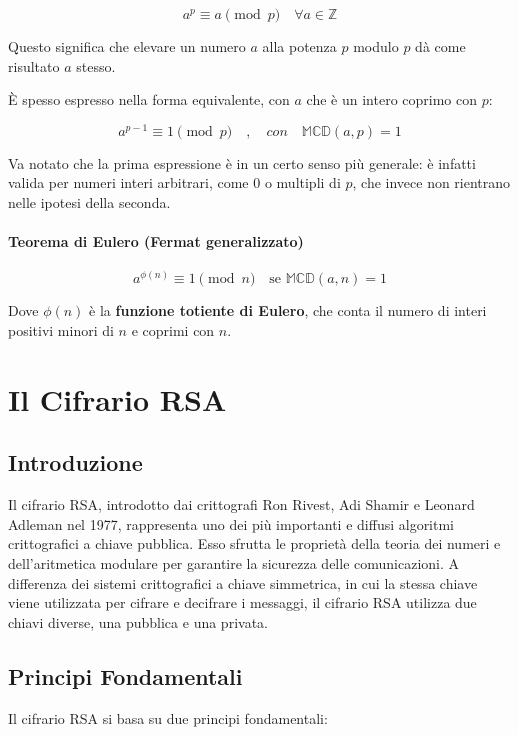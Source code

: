 \documentclass[a4paper,12pt]{report}
\begin{document}
$$a^p \equiv a \pmod{p} \quad \forall a \in \mathbb{Z}$$

Questo significa che elevare un numero $a$ alla potenza $p$ modulo $p$ dà come risultato $a$ stesso.

È spesso espresso nella forma equivalente, con \(a\) che è un intero coprimo con \(p\):

\[a^{p-1} \equiv 1 \pmod{p}\quad,\quad con\quad \mathbb{MCD}(a,p)=1\]

Va notato che la prima espressione è in un certo senso più generale: è infatti valida per numeri interi arbitrari, come \(0\) o multipli di \(p\), che invece non rientrano nelle ipotesi della seconda.

\subsubsection*{Teorema di Eulero (Fermat generalizzato)}

$$a^{\phi(n)} \equiv 1 \pmod{n} \quad \text{se } \mathbb{MCD}(a,n) = 1$$

Dove $\phi(n)$ è la \textbf{funzione totiente di Eulero}, che conta il numero di interi positivi minori di $n$ e coprimi con $n$.
%
%
%
%
%
%
%
%
%
%
%
%
%
%
%
%
%
%
%
%
%
%
%
%
%
%
%
%
%
%
%
%
%
%
%
%
%
%
%
%
%
\chapter{Il Cifrario RSA}

\section{Introduzione}
Il cifrario RSA, introdotto dai crittografi Ron Rivest, Adi Shamir e Leonard Adleman nel 1977, rappresenta uno dei più importanti e diffusi algoritmi crittografici a chiave pubblica. 
Esso sfrutta le proprietà della teoria dei numeri e dell'aritmetica modulare per garantire la sicurezza delle comunicazioni. 
A differenza dei sistemi crittografici a chiave simmetrica, in cui la stessa chiave viene utilizzata per cifrare e decifrare i messaggi, il cifrario RSA utilizza due chiavi diverse, una pubblica e una privata.

\section{Principi Fondamentali}
Il cifrario RSA si basa su due principi fondamentali:
\end{document}
